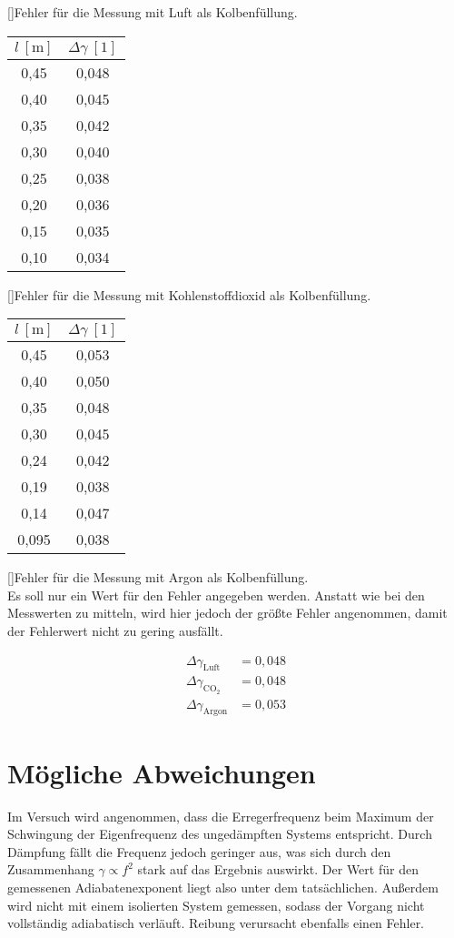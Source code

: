 []{Fehler für die Messung mit Luft als Kolbenfüllung.}
\begin{center}
      \begin{tabular}{c|c}
$l ~[\text{m}]$ & $\Delta\gamma ~[1]$    \\ \hline
0,45 & 0,048 \\
0,40  & 0,045 \\
0,35 & 0,042 \\
0,30  & 0,040 \\
0,25 & 0,038 \\
0,20  & 0,036 \\
0,15 & 0,035 \\
0,10  & 0,034
		\end{tabular}
	\end{center}
      
[]{Fehler für die Messung mit Kohlenstoffdioxid als Kolbenfüllung.}

\begin{center}
      \begin{tabular}{c|c}
$l ~ [\text{m}]$ & $\Delta\gamma ~[1]$    \\ \hline
0,45   & 0,053 \\
0,40    & 0,050 \\
0,35   & 0,048 \\
0,30    & 0,045 \\
0,24   & 0,042 \\
0,19   & 0,038 \\
0,14   & 0,047 \\
0,095  & 0,038 
		\end{tabular}
	\end{center}
      
[]{Fehler für die Messung mit Argon als Kolbenfüllung.}
\ \\
Es soll nur ein Wert für den Fehler angegeben werden. Anstatt wie bei den Messwerten zu mitteln, wird hier jedoch der größte Fehler angenommen, damit der Fehlerwert nicht zu gering ausfällt.

\begin{align*}
 	\Delta \gamma_{\text{Luft}} & = 0,048\\
    \Delta \gamma_{\text{CO}_2} & = 0,048\\
    \Delta \gamma_{\text{Argon}}& = 0,053
\end{align*}

     	\section{Mögliche Abweichungen}
        	Im Versuch wird angenommen, dass die Erregerfrequenz beim Maximum der Schwingung der Eigenfrequenz des ungedämpften Systems entspricht. Durch Dämpfung fällt die Frequenz jedoch geringer aus, was sich durch den Zusammenhang $\gamma \propto f^2$ stark auf das Ergebnis auswirkt. Der Wert für den gemessenen Adiabatenexponent liegt also unter dem tatsächlichen. Außerdem wird nicht mit einem isolierten System gemessen, sodass der Vorgang nicht vollständig adiabatisch verläuft. Reibung verursacht ebenfalls einen Fehler.
	\pagebreak